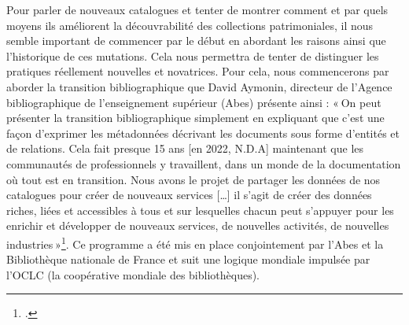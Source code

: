 Pour parler de nouveaux catalogues et tenter de montrer comment et par quels moyens ils améliorent la découvrabilité des collections patrimoniales, il nous semble important de commencer par le début en abordant les raisons ainsi que l’historique de ces mutations. Cela nous permettra de tenter de distinguer les pratiques réellement nouvelles et novatrices. Pour cela, nous commencerons par aborder la transition bibliographique que David Aymonin, directeur de l’Agence bibliographique de l’enseignement supérieur (Abes) présente ainsi : « On peut présenter la transition bibliographique simplement en expliquant que c’est une façon d’exprimer les métadonnées décrivant les documents sous forme d’entités et de relations. Cela fait presque 15 ans [en 2022, N.D.A] maintenant que les communautés de professionnels y travaillent, dans un monde de la documentation où tout est en transition. Nous avons le projet de partager les données de nos catalogues pour créer de nouveaux services […] il s’agit de créer des données riches, liées et accessibles à tous et sur lesquelles chacun peut s’appuyer pour les enrichir et développer de nouveaux services, de nouvelles activités, de nouvelles industries »\footcite[§3 et §4]{carre-marillonnet_transition_2022}. Ce programme a été mis en place conjointement par l’Abes et la Bibliothèque nationale de France et suit une logique mondiale impulsée par l’OCLC (la coopérative mondiale des bibliothèques).

